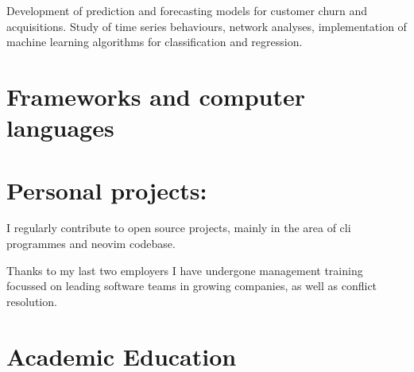 \documentclass[11pt,a4paper,sans]{moderncv}
\begin{document}
 {%
	Development of prediction and forecasting models for customer churn and acquisitions. Study of time series behaviours, network analyses, implementation of machine learning algorithms for classification and regression.}



\newpage
\section{Frameworks and computer languages}

\section{Personal projects:}


\medskip
I regularly contribute to open source projects, mainly in the area of cli
programmes and neovim codebase.

\medskip
Thanks to my last two employers I have undergone management training
focussed on leading software teams in growing companies, as well as conflict
resolution.


\section{Academic Education}
\end{document}
